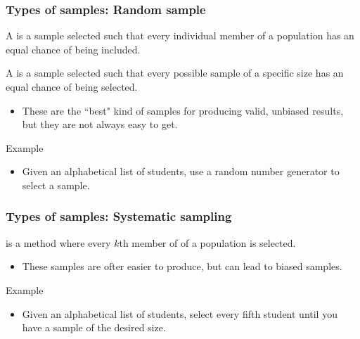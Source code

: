 \documentclass[xcolor=table, aspectratio=169, bigger]{beamer}
\begin{document}
\begin{frame}
\frametitle{Types of samples: Random sample}

\begin{block}{}
A  is a sample selected such that every individual member of a population has an equal chance of being included.
\end{block}
\pause
\begin{block}{}
A  is a sample selected such that every possible sample of a specific size has an equal chance of being selected.
\begin{itemize}
\item These are the ``best" kind of samples for producing valid, unbiased results, but they are not always easy to get. 
\end{itemize}
\end{block}
\pause
\begin{exampleblock}{Example}
\begin{itemize}
\item Given an alphabetical list of students, use a random number generator to select a sample.
\end{itemize}
\end{exampleblock}

\end{frame}

\begin{frame}
\frametitle{Types of samples: Systematic sampling}

\begin{block}{}
 is a method where every $k$th member of of a population is selected.
\begin{itemize}
\item These samples are ofter easier to produce, but can lead to biased samples. 
\end{itemize}
\end{block}
\pause
\begin{exampleblock}{Example}
\begin{itemize}
\item Given an alphabetical list of students, select every fifth student until you have a sample of the desired size.
\end{itemize}
\end{exampleblock}

\end{frame}
\end{document}

